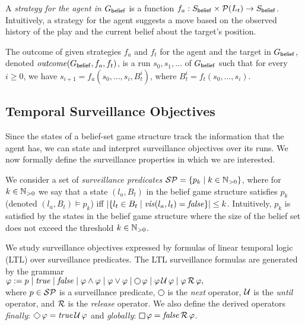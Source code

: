 A \emph{strategy for the agent in $G_{\mathsf{belief}}$} is a function $f_a : S_{\mathsf{belief}} \times \mathcal{P}(L_t) \to S_{\mathsf{belief}}$. Intuitively, a strategy for the agent suggests a move based on the observed history of the play and the current belief about the target's position.

The outcome of given strategies $f_a$ and $f_t$ for the agent and the target in $G_{\mathsf{belief}}$, denoted $\mathit{outcome}(G_{\mathsf{belief}},f_a,f_t)$, is a run $s_0,s_1,\ldots$ of $G_{\mathsf{belief}}$ such that for every $i \geq 0$, we have $s_{i+1} = f_a(s_0,\ldots,s_i,B_t^i)$, where $B_t^i = f_t(s_0,\ldots,s_i)$.


\subsection{Temporal Surveillance Objectives}
Since the states of a belief-set game structure track the information that the agent has, we can state and interpret surveillance objectives over its runs. We now formally define the surveillance properties in which we are interested. 

We consider a set of \emph{surveillance predicates} $\mathcal{SP} = \{p_k \mid k \in \mathbb{N}_{>0}\}$, where for $k \in \mathbb{N}_{>0}$ we say that a state $(l_a,B_t)$ in the belief game structure satisfies $p_k$ (denoted $(l_a,B_t) \models p_k$) iff 
$|\{l_t \in B_t \mid \mathit{vis}(l_a,l_t)  = \mathit{false} \}| \leq k$. Intuitively, $p_k$ is satisfied by the states in the belief game structure where the size of the belief set does not exceed the threshold $k \in \mathbb{N}_{>0}$.

We study surveillance objectives expressed by formulas of linear temporal logic (LTL) over surveillance predicates.
 The LTL surveillance formulas  are generated by the grammar\\
$\varphi := p \mid \true \mid \false \mid \varphi \wedge \varphi \mid \varphi \vee \varphi \mid \LTLnext  \varphi  \mid \varphi \LTLuntil \varphi \mid \varphi \LTLrelease \varphi,$\\
where $p \in \mathcal{SP}$ is a surveillance predicate, $\LTLnext$ is the \emph{next} operator, $\operatorname{\mathcal{U}}$ is the \emph{until} operator, and $\operatorname{\mathcal{R}}$ is the \emph{release} operator. We also define the derived operators 
\emph{finally}: $\LTLfinally \varphi = \true \LTLuntil \varphi$ and 
\emph{globally}: $\LTLglobally \varphi = \false \LTLrelease \varphi$.

